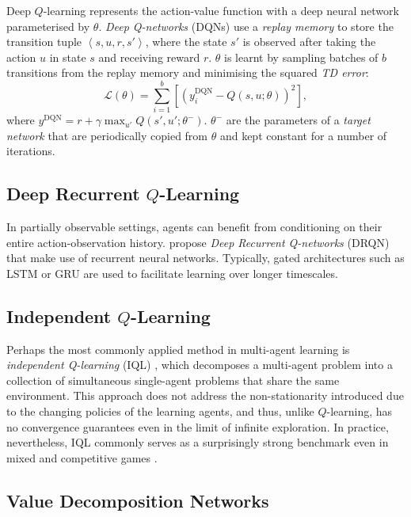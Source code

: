 \documentclass{article}
\begin{document}
Deep $Q$-learning represents the action-value function with a deep neural network parameterised by $\theta$. \textit{Deep Q-networks} (DQNs) \cite{mnih_human-level_2015} use a  \textit{replay memory} to store the transition tuple $\left\langle s,u,r,s'\right\rangle$, where the state  $s'$  is observed after taking the action $u$ in state $s$ and receiving reward $r$. $\theta$ is learnt by sampling batches of $b$ transitions from the replay memory and minimising the squared \textit{TD error}:
\begin{equation}\label{eq:dqn}
\mathcal{L}(\theta)=\sum\limits_{i=1}^{b}\left[\left(y_i^{\text{DQN}}-Q(s,u;\theta)\right)^2\right],
\end{equation} 
where $y^{\text{DQN}}=r+\gamma\max_{u'} Q(s',u';\theta^-)$. $\theta^-$ are the parameters of a \textit{target network} that are periodically copied from $\theta$ and kept constant for a number of iterations.  

\subsection{Deep Recurrent $Q$-Learning}

In partially observable settings, agents can benefit from conditioning on their entire action-observation history. \citet{hausknecht_deep_2015} propose \textit{Deep Recurrent Q-networks} (DRQN) that make use of recurrent neural networks. Typically, gated architectures such as LSTM \cite{hochreiter_long_1997} or GRU \cite{chung_empirical_2014} are used to facilitate learning over longer timescales.

\subsection{Independent $Q$-Learning}

Perhaps the most commonly applied method in multi-agent learning is \textit{independent Q-learning} (IQL) \cite{tan_multi-agent_1993}, which decomposes a multi-agent problem into a collection of simultaneous single-agent problems that share the same environment. This approach does not address the non-stationarity introduced due to the changing policies of the learning agents, and thus, unlike $Q$-learning, has no convergence guarantees even in the limit of infinite exploration. In practice, nevertheless, IQL commonly serves as a surprisingly strong benchmark even in mixed and competitive games \cite{tampuu_multiagent_2015, leibo_multi-agent_2017}.


\subsection{Value Decomposition Networks}
\end{document}
